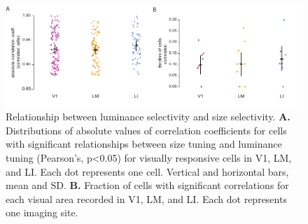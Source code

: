 \begin{figure}[t!]
\includegraphics[width=\textwidth]{figures/supplemental/fig_s12_luminance_corr/fig_s12_luminance_corr.pdf}
    \vspace{.1in}
    \caption[Luminance and size tuning]{Relationship between luminance selectivity and size selectivity.
    \textbf{A.} Distributions of absolute values of correlation coefficients for cells with significant relationships between size tuning and luminance tuning (Pearson's, p<0.05) for visually responsive cells in V1, LM, and LI. Each dot represents one cell. Vertical and horizontal bars, mean and SD. 
    \textbf{B.} Fraction of cells with significant correlations for each visual area recorded in V1, LM, and LI. Each dot represents one imaging site.  
    \label{supfig:luminance_corr}}
\end{figure}






